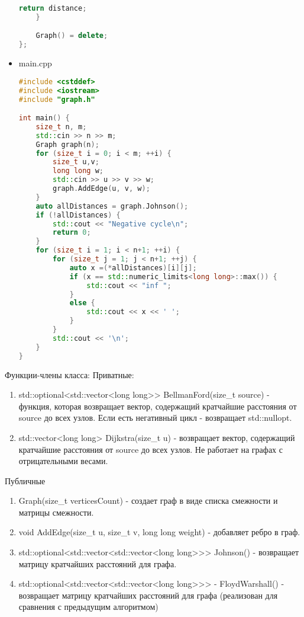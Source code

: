 \documentclass[12pt]{article}
\begin{document}
\begin{itemize}
\begin{lstlisting}[language=C++]
        return distance;
    }

    Graph() = delete;
};
        \end{lstlisting}

        \item
        main.cpp
        \begin{lstlisting}[language=C++]
#include <cstddef>
#include <iostream>
#include "graph.h"

int main() {
    size_t n, m;
    std::cin >> n >> m;
    Graph graph(n);
    for (size_t i = 0; i < m; ++i) {
        size_t u,v;
        long long w;
        std::cin >> u >> v >> w;
        graph.AddEdge(u, v, w);
    }
    auto allDistances = graph.Johnson();
    if (!allDistances) {
        std::cout << "Negative cycle\n";
        return 0;
    }
    for (size_t i = 1; i < n+1; ++i) {
        for (size_t j = 1; j < n+1; ++j) {
            auto x =(*allDistances)[i][j];
            if (x == std::numeric_limits<long long>::max()) {
                std::cout << "inf ";
            }
            else {
                std::cout << x << ' ';
            }
        }
        std::cout << '\n';
    }
}
        \end{lstlisting}
\end{itemize}

Функции-члены класса:
Приватные:
\begin{enumerate}
    \item std::optional<std::vector<long long>> BellmanFord(size\_t source)
     - функция, которая возвращает вектор, содержащий кратчайшие расстояния от source до всех узлов. Если есть негативный цикл - возвращает std::nullopt.
    \item std::vector<long long> Dijkstra(size\_t u) - возвращает вектор, содержащий кратчайшие расстояния от source до всех узлов. Не работает на графах с отрицательными весами.
\end{enumerate}
Публичные
\begin{enumerate}
    \item Graph(size\_t verticesCount) - создает граф в виде списка смежности и матрицы смежности.
    \item void AddEdge(size\_t u, size\_t v, long long weight) - добавляет ребро в граф.
    \item std::optional<std::vector<std::vector<long long>>> Johnson() - возвращает матрицу кратчайших расстояний для графа.
    \item std::optional<std::vector<std::vector<long long>>> - FloydWarshall() - возвращает матрицу кратчайших расстояний для графа (реализован для сравнения с предыдущим алгоритмом)
\end{enumerate}
\end{document}
